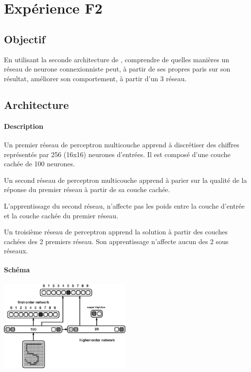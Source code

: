 \section{Expérience F2} 
  \subsection{Objectif}
    En utilisant la seconde architecture de \cite{Cleeremans_2007}, 
    comprendre de quelles manières un réseau de neurone connexionniste peut, à partir de ses propres paris
    sur son résultat, améliorer son comportement, à partir d'un 3 réseau.
  
  
     
  \subsection{Architecture}
    \paragraph{Description}
      Un premier réseau de perceptron multicouche apprend à discrétiser des chiffres représentés
      par 256 (16x16) neurones d'entrées. Il est composé d'une couche cachée de 100 neurones.
      
      Un second réseau de perceptron multicouche apprend à parier sur la qualité de la réponse
      du premier réseau à partir de sa couche cachée.
      
      L'apprentissage du second réseau, n'affecte pas les poids entre la couche d'entrée et la 
      couche cachée du premier réseau.
      
      Un troisième réseau de perceptron apprend la solution à partir des couches cachées des 2 premiers 
      réseau. Son apprentissage n'affecte aucun des 2 sous réseaux.


    \paragraph{Schéma}
      \begin{center}
	\includegraphics[width=250px]{data/expF2/schema.png}
      \end{center}
      
